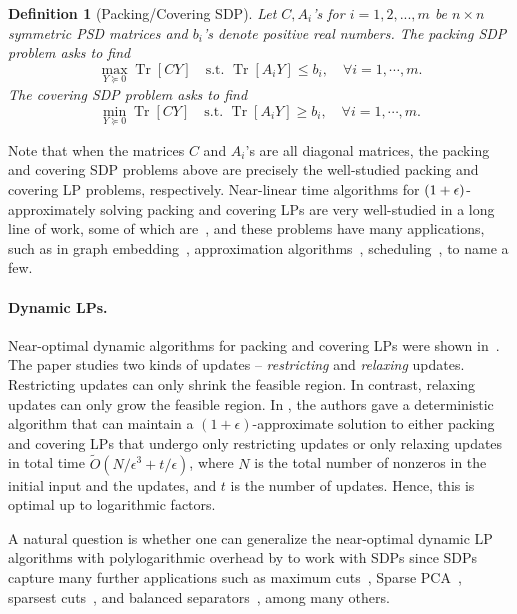 \documentclass[11pt]{article}
\newtheorem{definition}[theorem]{Definition}
\DeclareMathOperator{\Tr}{Tr}
\renewcommand\AA{\boldsymbol{\mathit{A}}}
\newcommand\CC{\boldsymbol{\mathit{C}}}
\newcommand\YY{\boldsymbol{\mathit{Y}}}
\newcommand\Otil{\widetilde{O}}
\begin{document}
\begin{definition}[Packing/Covering SDP] Let $\CC, \AA_i$'s for $i = 1,2,...,m$ be $n\times n$ symmetric PSD matrices and $b_i$'s denote positive real numbers. The packing SDP problem asks to find
\[
\max_{\YY\succeq 0} \Tr[\CC\YY]  \quad \text{s.t.  } \Tr[\AA_i\YY]\leq b_i, \quad\forall i = 1,\cdots, m.
\]
The covering SDP problem asks to find
\[
\min_{\YY\succeq 0} \Tr[\CC\YY]  \quad \text{s.t.  } \Tr[\AA_i\YY]\geq b_i, \quad\forall i = 1,\cdots, m.
\]
\end{definition}
Note that when the matrices $\CC$ and $\AA_i$'s are all diagonal matrices, the packing and covering SDP problems above are precisely the well-studied packing and covering LP problems, respectively. Near-linear time algorithms for $(1+\epsilon)$-approximately solving packing and covering LPs are very well-studied in a long line of work, some of which are~\cite{allen2015nearly,allen2019nearly,wang2016unified,quanrud2020nearly}, and these problems have many applications, such as in graph embedding~\cite{plotkin1995fast}, approximation algorithms~\cite{luby1993parallel,trevisan1998parallel}, scheduling~\cite{plotkin1995fast}, to name a few.

\paragraph{Dynamic LPs.}
Near-optimal dynamic algorithms for packing and covering LPs were shown in~\cite{bhattacharya2023dynamic}. The paper studies two kinds of updates -- {\it restricting} and {\it relaxing} updates.
Restricting updates can only shrink the feasible region. In contrast, relaxing updates can only grow the feasible region.
In \cite{bhattacharya2023dynamic}, the authors gave a deterministic algorithm that can maintain a $(1+\epsilon)$-approximate solution to either packing and covering LPs that undergo only restricting updates or only relaxing updates in total time $\Otil(N/\epsilon^3 + t/\epsilon)$, where $N$ is the total number of nonzeros in the initial input and the updates, and $t$ is the number of updates. Hence, this is optimal up to logarithmic factors. 

A natural question is whether one can generalize the near-optimal dynamic LP algorithms with polylogarithmic overhead by \cite{bhattacharya2023dynamic} to work with SDPs since SDPs capture many further applications such as maximum cuts~\cite{iyengar2011approximating,klein1996efficient}, Sparse PCA~\cite{iyengar2011approximating}, sparsest cuts~\cite{iyengar2010feasible}, and  balanced separators~\cite{orecchia2012approximating}, among many others.
\end{document}
